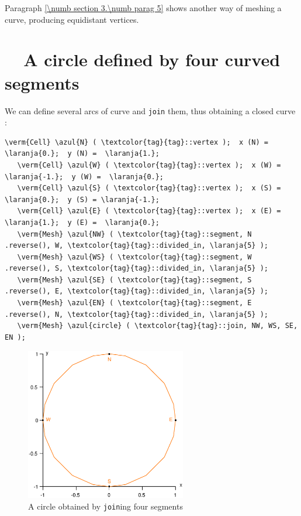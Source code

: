 Paragraph \ref{\numb section 3.\numb parag 5} shows another way of meshing a curve,
producing equidistant vertices.


\section{~~A circle defined by four curved segments}\label{\numb section 2.\numb parag 5}

We can define several arcs of curve and {\small\tt join} them, thus obtaining a closed curve :
\medskip

\begin{Verbatim}[commandchars=\\\{\},formatcom=\small\tt,frame=single,
   label=parag-\ref{\numb section 2.\numb parag 5}.cpp,rulecolor=\color{coment},
   baselinestretch=0.94,framesep=2mm]
   \verm{Cell} \azul{N} ( \textcolor{tag}{tag}::vertex );  x (N) =  \laranja{0.};  y (N) =  \laranja{1.};
   \verm{Cell} \azul{W} ( \textcolor{tag}{tag}::vertex );  x (W) = \laranja{-1.};  y (W) =  \laranja{0.};
   \verm{Cell} \azul{S} ( \textcolor{tag}{tag}::vertex );  x (S) =  \laranja{0.};  y (S) = \laranja{-1.};
   \verm{Cell} \azul{E} ( \textcolor{tag}{tag}::vertex );  x (E) =  \laranja{1.};  y (E) =  \laranja{0.};
   \verm{Mesh} \azul{NW} ( \textcolor{tag}{tag}::segment, N .reverse(), W, \textcolor{tag}{tag}::divided_in, \laranja{5} );
   \verm{Mesh} \azul{WS} ( \textcolor{tag}{tag}::segment, W .reverse(), S, \textcolor{tag}{tag}::divided_in, \laranja{5} );
   \verm{Mesh} \azul{SE} ( \textcolor{tag}{tag}::segment, S .reverse(), E, \textcolor{tag}{tag}::divided_in, \laranja{5} );
   \verm{Mesh} \azul{EN} ( \textcolor{tag}{tag}::segment, E .reverse(), N, \textcolor{tag}{tag}::divided_in, \laranja{5} );
   \verm{Mesh} \azul{circle} ( \textcolor{tag}{tag}::join, NW, WS, SE, EN );
\end{Verbatim}

\begin{figure}[ht] \centering
  \includegraphics[width=70mm]{circle}
  \caption{A circle obtained by {\small\tt join}ing four segments}
  \label{\numb section 2.\numb fig 5}
\end{figure}

